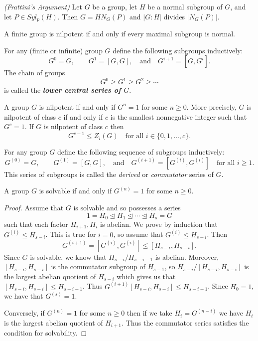 \nl

\begin{prop}\textit{(Frattini's Argument)}
Let $G$ be a group, let $H$ be a normal subgroup of $G$, and let $P\in Syl_p(H)$. Then $G=HN_G(P)$ and $|G:H|$ divides $|N_G(P)|$.
\end{prop}

\nl

\begin{prop}
A finite group is nilpotent if and only if every maximal subgroup is normal.
\end{prop}

\nl

\begin{defn}
For any (finite or infinite) group $G$ define the following subgroups inductively:
\[G^0 = G,\qquad G^1 = [G,G],\quad\text{and}\quad G^{i+1} = [G,G^i].\]
The chain of groups 
\[G^0\geq G^1\geq G^2\geq\cdots\]
is called the \textbf{\textit{lower central series of $G$}}.
\end{defn}

\nl

\begin{thm}
A group $G$ is nilpotent if and only if $G^n = 1$ for some $n\geq 0$. More precisely, $G$ is nilpotent of class $c$ if and only if $c$ is the smallest nonnegative integer such that $G^c = 1$. If $G$ is nilpotent of class $c$ then
\[G^{c-1} \leq Z_i(G)\quad\text{for all } i\in \{0,1,\ldots,c\}.\]
\end{thm}

\nl

\begin{defn}
For any group $G$ define the following sequence of subgroups inductively:
\[G^{(0)} = G,\qquad G^{(1)} = [G,G],\quad\text{and}\quad G^{(i+1)} = [G^{(i)},G^{(i)}]\quad\text{for all }i\geq 1.\]
This series of subgroups is called the \textit{derived} or \textit{commutator} series of $G$.
\end{defn}

\nl

\begin{thm}
A group $G$ is solvable if and only if $G^{(n)} = 1$ for some $n\geq 0$.
\end{thm}

\begin{proof}
Assume that $G$ is solvable and so possesses a series 
\[1 = H_0\unlhd H_1\unlhd \cdots\unlhd H_s = G\]
such that each factor $H_{i+1}, H_i$ is abelian. We prove by induction that $G^{(i)}\leq H_{s-i}$. This is true for $i = 0$, so assume that $G^{(i)}\leq H_{s-i}$. Then
\[G^{(i+1)} = [G^{(i)},G^{(i)}] \leq [H_{s-i},H_{s-i}].\]
Since $G$ is solvable, we know that $H_{s-i}/H_{s-i-1}$ is abelian. Moreover, $[H_{s-i},H_{s-i}]$ is the commutator subgroup of $H_{s-1}$, so $H_{s-i}/[H_{s-i},H_{s-i}]$ is the largest abelian quotient of $H_{s-i}$ which gives us that $[H_{s-i},H_{s-i}]\leq H_{s-i-1}$. Thus $G^{(i+1)} [H_{s-i},H_{s-i}]\leq H_{s-i-1}$. Since $H_0 = 1$, we have that $G^{(s)} = 1$.

Conversely, if $G^{(n)} = 1$ for some $n\geq 0$ then if we take $H_i = G^{(n - i)}$ we have $H_i$ is the largest abelian quotient of $H_{i+1}$. Thus the commutator series satisfies the condition for solvability.
\end{proof}

